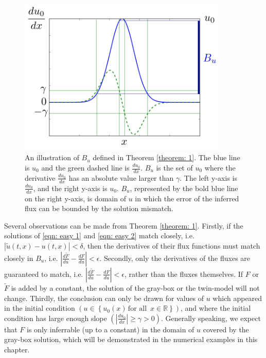 \begin{figure}[htbp]
    \begin{center}
        \includegraphics[width=10cm]{../excitedDomain.png}
        \caption{An illustration of $B_u$ defined in Theorem \ref{theorem: 1}. The blue line is $u_0$ 
        and the green dashed line is $\frac{du_0}{dx}$. $B_u$ is the set of $u_0$ where the derivative 
        $\frac{du_0}{dx}$ has an absolute value larger than $\gamma$.
        The left y-axis is $\frac{du_0}{dx}$, and the right y-axis is $u_0$.
        $B_u$, represented by the bold blue line on the right y-axis,
        is domain of $u$ in which the error of the inferred flux can be bounded by the solution
        mismatch.}
        \label{fig: excitedDomain}
    \end{center}
\end{figure}

Several observations can be made from Theorem \ref{theorem: 1}.
Firstly, if the solutions of \eqref{eqn: easy 1} and \eqref{eqn: easy 2} match closely, i.e.
$|\tilde{u}(t,x)-u(t,x)| < \delta$, then
the derivatives of their flux functions must match closely in $B_u$, i.e.
$\left|\frac{d\tilde{F}}{du} - \frac{dF}{du}\right| < \epsilon$. 
Secondly, only the derivatives of the fluxes are guaranteed to match, i.e.
$\left|\frac{d\tilde{F}}{du} - \frac{dF}{du}\right| < \epsilon$,
rather than the fluxes themselves. 
If $F$ or $\tilde{F}$ is added by a constant, the solution of the gray-box or the twin-model
will not change.
Thirdly, the conclusion 
can only be drawn for values of $u$ which appeared in the initial condition 
$\left(u\in \left\{u_0(x)\, \textrm{for all } \, x\in \mathbb{R}\right\}\right)$, 
and where the initial condition has large enough slope $\left(\left|\frac{du_0}{dx}\right|\ge \gamma > 0\right)$.
Generally speaking, 
we expect that $F$ is only inferrable (up to a constant) in the domain of $u$ covered by the gray-box 
solution, which will be demonstrated in the numerical examples in this chapter.\\


